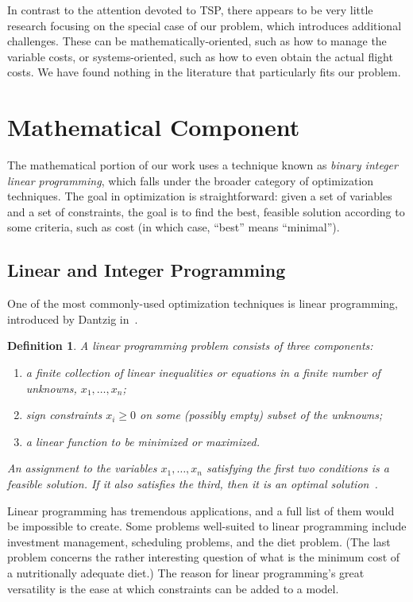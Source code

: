 \documentclass{article}
\newtheorem{defi}[thm]{Definition}
\begin{document}
In contrast to the attention devoted to TSP, there appears to be very little research focusing on the special case of our problem, which introduces
additional challenges. These can be mathematically-oriented, such as how to manage the variable costs, or systems-oriented, such as how to even obtain
the actual flight costs. We have found nothing in the literature that particularly fits our problem.

\section{Mathematical Component}\label{sec:math}

The mathematical portion of our work uses a technique known as \emph{binary integer linear programming}, which falls under the broader category of
optimization techniques. The goal in optimization is straightforward: given a set of variables and a set of constraints, the goal is to find the best,
feasible solution according to some criteria, such as cost (in which case, ``best'' means ``minimal'').

\subsection{Linear and Integer Programming}\label{sec:lin_int_programming}

One of the most commonly-used optimization techniques is linear programming, introduced by Dantzig in~\cite{GVK180926950}.

\begin{defi}\label{defi:linear_programming}
A \emph{linear programming problem} consists of three components: 
\begin{enumerate}[noitemsep]
    \item a finite collection of linear inequalities or equations in a finite number of unknowns, $x_1, \ldots, x_n$;
    \item sign constraints $x_i \ge 0$ on some (possibly empty) subset of the unknowns;
    \item a linear function to be minimized or maximized.
\end{enumerate}
An assignment to the variables $x_1, \ldots, x_n$ satisfying the first two conditions is a \emph{feasible} solution. If it also satisfies the third,
then it is an \emph{optimal} solution~\cite{opac-b1105716}.
\end{defi}

Linear programming has tremendous applications, and a full list of them would be impossible to create. Some problems well-suited to linear programming
include investment management, scheduling problems, and the diet problem. (The last problem concerns the rather interesting question of what is the
minimum cost of a nutritionally adequate diet.) The reason for linear programming's great versatility is the ease at which constraints can be added to
a model.
\end{document}

